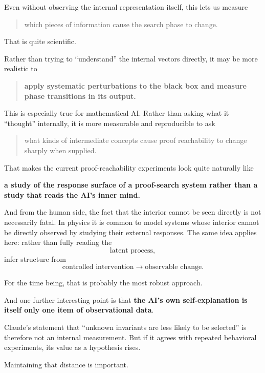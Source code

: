 \documentclass[11pt,a4paper]{article}
\begin{document}
Even without observing the internal representation itself, this lets us measure
\begin{quote}
which pieces of information cause the search phase to change.
\end{quote}

That is quite scientific.

Rather than trying to “understand” the internal vectors directly, it may be more realistic to
\begin{quote}
\textbf{apply systematic perturbations to the black box and measure phase transitions in its output.}
\end{quote}

This is especially true for mathematical AI. Rather than asking what it “thought” internally, it is more measurable and reproducible to ask
\begin{quote}
what kinds of intermediate concepts cause proof reachability to change sharply when supplied.
\end{quote}

That makes the current proof-reachability experiments look quite naturally like

\textbf{a study of the response surface of a proof-search system rather than a study that reads the AI's inner mind.}

And from the human side, the fact that the interior cannot be seen directly is not necessarily fatal. In physics it is common to model systems whose interior cannot be directly observed by studying their external responses. The same idea applies here: rather than fully reading the
\[
\text{latent process},
\]
infer structure from
\[
\text{controlled intervention}
\to
\text{observable change}.
\]

For the time being, that is probably the most robust approach.

And one further interesting point is that \textbf{the AI's own self-explanation is itself only one item of observational data}.

Claude's statement that “unknown invariants are less likely to be selected” is therefore not an internal measurement. But if it agrees with repeated behavioral experiments, its value as a hypothesis rises.

Maintaining that distance is important.
\end{document}
